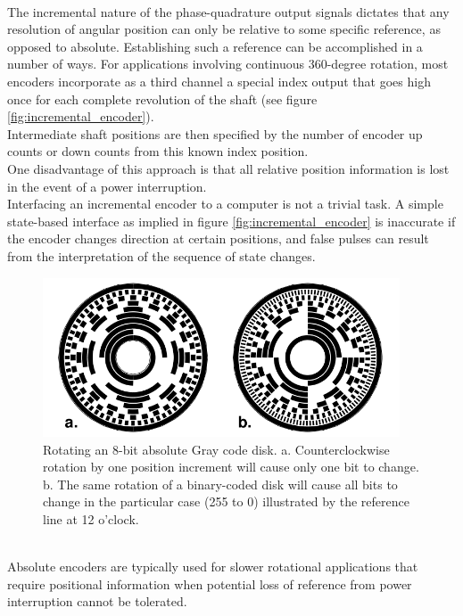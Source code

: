 \\
The incremental nature of the phase-quadrature output signals dictates that
any resolution of angular position can only be relative to some specific
reference, as opposed to absolute. Establishing such a reference can be
accomplished in a number of ways. For applications involving continuous
360-degree rotation, most encoders incorporate as a third channel a special
index output that goes high once for each complete revolution of the shaft
(see figure \ref{fig:incremental_encoder}).
\\
Intermediate shaft positions are then specified by the number of encoder
up counts or down counts from this known index position.
\\
One disadvantage of this approach is that all relative position information
is lost in the event of a power interruption.
\\
Interfacing an incremental encoder to a computer is not a trivial task.
A simple state-based interface as implied in figure \ref{fig:incremental_encoder}
is inaccurate if
the encoder changes direction at certain positions, and false pulses can
result from the interpretation of the sequence of state changes.
\begin{figure} [!h]
  \begin{center}
    \includegraphics[width=300pt]{img/absolute_encoder.png}
    \caption{Rotating an 8-bit absolute Gray code disk.
      a. Counterclockwise rotation by one position increment will cause
      only one bit to change.
      b. The same rotation of a binary-coded disk will cause all bits to
      change in the particular case (255 to 0) illustrated by the
      reference line at 12 o'clock.}
    \label{fig:absolute_encoder}
  \end{center}
\end{figure}
\\
Absolute encoders are typically used for slower rotational applications
that require positional information when potential loss of reference
from power interruption cannot be tolerated.
\\
